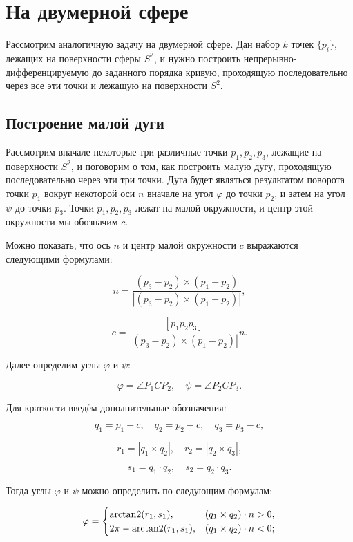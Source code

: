 \section{На двумерной сфере}

Рассмотрим аналогичную задачу на двумерной сфере. Дан набор $k$ точек $\{p_i\}$, лежащих на поверхности сферы $S^2$, и
нужно построить непрерывно-дифференци\-руемую до заданного порядка кривую, проходящую последовательно через все эти
точки и лежащую на поверхности $S^2$.

\subsection*{Построение малой дуги}

Рассмотрим вначале некоторые три различные точки $p_1, p_2, p_3$, лежащие на поверхности $S^2$, и поговорим о
том, как построить малую дугу, проходящую последовательно через эти три точки. Дуга будет являться результатом поворота
точки $p_1$ вокруг некоторой оси $n$ вначале на угол $\varphi$ до точки $p_2$, и затем на угол $\psi$ до точки $p_3$.
Точки $p_1, p_2, p_3$ лежат на малой окружности, и центр этой окружности мы обозначим $c$.

Можно показать, что ось $n$ и центр малой окружности $c$ выражаются следующими формулами:

\begin{equation}
n=\frac{(p_3-p_2)\times(p_1-p_2)}{|(p_3-p_2)\times(p_1-p_2)|},
\label{two-dimenstion-sphere-axis}
\end{equation}

$$
c=\frac{[p_1p_2p_3]}{|(p_3-p_2)\times(p_1-p_2)|}n.
$$

Далее определим углы $\varphi$ и $\psi$:

$$
\varphi=\angle P_1CP_2, \quad \psi=\angle P_2CP_3.
$$

Для краткости введём дополнительные обозначения:

$$
q_1=p_1-c, \quad q_2=p_2-c, \quad q_3=p_3-c,
$$

$$
r_1=|q_1\times q_2|, \quad r_2=|q_2\times q_3|,
$$

$$
s_1=q_1\cdot q_2, \quad s_2=q_2\cdot q_3.
$$

Тогда углы $\varphi$ и $\psi$ можно определить по следующим формулам:

\begin{equation}
\varphi=
 \begin{cases}
   \operatorname{arctan2}(r_1,s_1),      & (q_1\times q_2)\cdot n>0, \\
   2\pi-\operatorname{arctan2}(r_1,s_1), & (q_1\times q_2)\cdot n<0;
 \end{cases}
\label{two-dimension-sphere-phi-angle}
\end{equation}

